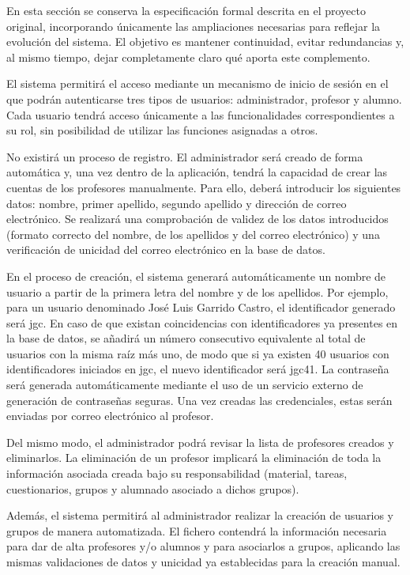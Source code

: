 En esta sección se conserva la especificación formal descrita en el proyecto original, incorporando únicamente las ampliaciones necesarias para reflejar la evolución del sistema. El objetivo es mantener continuidad, evitar redundancias y, al mismo tiempo, dejar completamente claro qué aporta este complemento.

El sistema permitirá el acceso mediante un mecanismo de inicio de sesión en el que podrán autenticarse tres tipos de usuarios: administrador, profesor y alumno. Cada usuario tendrá acceso únicamente a las funcionalidades correspondientes a su rol, sin posibilidad de utilizar las funciones asignadas a otros.

No existirá un proceso de registro. El administrador será creado de forma automática y, una vez dentro de la aplicación, tendrá la capacidad de crear las cuentas de los profesores manualmente. Para ello, deberá introducir los siguientes datos: nombre, primer apellido, segundo apellido y dirección de correo electrónico. Se realizará una comprobación de validez de los datos introducidos (formato correcto del nombre, de los apellidos y del correo electrónico) y una verificación de unicidad del correo electrónico en la base de datos.

En el proceso de creación, el sistema generará automáticamente un nombre de usuario a partir de la primera letra del nombre y de los apellidos. Por ejemplo, para un usuario denominado José Luis Garrido Castro, el identificador generado será jgc. En caso de que existan coincidencias con identificadores ya presentes en la base de datos, se añadirá un número consecutivo equivalente al total de usuarios con la misma raíz más uno, de modo que si ya existen 40 usuarios con identificadores iniciados en jgc, el nuevo identificador será jgc41. La contraseña será generada automáticamente mediante el uso de un servicio externo de generación de contraseñas seguras. Una vez creadas las credenciales, estas serán enviadas por correo electrónico al profesor.

Del mismo modo, el administrador podrá revisar la lista de profesores creados y eliminarlos. La eliminación de un profesor implicará la eliminación de toda la información asociada creada bajo su responsabilidad (material, tareas, cuestionarios, grupos y alumnado asociado a dichos grupos).

Además, el sistema permitirá al administrador realizar la creación de usuarios y grupos de manera automatizada. El fichero contendrá la información necesaria para dar de alta profesores y/o alumnos y para asociarlos a grupos, aplicando las mismas validaciones de datos y unicidad ya establecidas para la creación manual.

